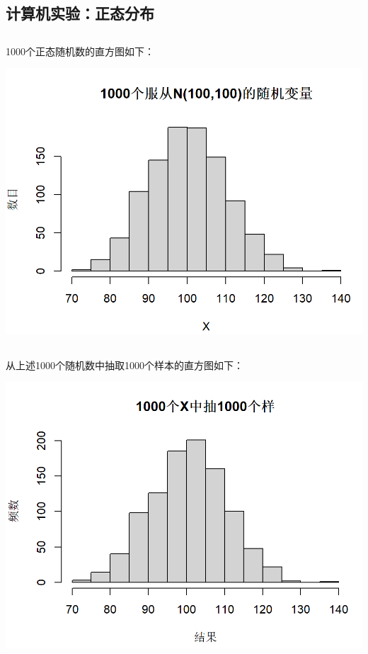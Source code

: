 \documentclass{article}
\begin{document}
\begin{CJK}{UTF8}{gbsn}
\section{计算机实验：正态分布}
\subsection{}
1000个正态随机数的直方图如下：
\\
\begin{minipage}{0.5\textwidth}
    \includegraphics[scale=0.6]{hist1.png}
\end{minipage}
\subsection{}
从上述1000个随机数中抽取1000个样本的直方图如下：
\\
\begin{minipage}{0.5\textwidth}
    \includegraphics[scale=0.6]{hist2.png}
\end{minipage}

\end{CJK}
\end{document}

